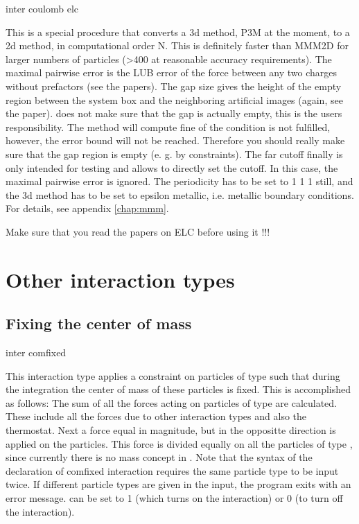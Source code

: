 \begin{essyntax}
  inter coulomb elc  
\end{essyntax}
This is a special procedure that converts a 3d method, \ie P3M at the
moment, to a 2d method, in computational order N. This is definitely
faster than MMM2D for larger numbers of particles (>400 at reasonable
accuracy requirements). The maximal pairwise error is the LUB error of
the force between any two charges without prefactors (see the papers).
The gap size gives the height of the empty region between the system
box and the neighboring artificial images (again, see the paper).
\es{} does not make sure that the gap is actually empty, this is the
users responsibility. The method will compute fine of the condition is
not fulfilled, however, the error bound will not be reached. Therefore
you should really make sure that the gap region is empty (e. g. by
constraints). The far cutoff finally is only intended for testing and
allows to directly set the cutoff. In this case, the maximal pairwise
error is ignored. The periodicity has to be set to 1 1 1 still, and
the 3d method has to be set to epsilon metallic, i.e.  metallic
boundary conditions. For details, see appendix \vref{chap:mmm}.

Make sure that you read the papers on ELC before using it !!!

\section{Other interaction types}
\label{sec:inter-other}

\subsection{Fixing the center of mass}
\begin{essyntax}
  inter   comfixed 
\end{essyntax}
This interaction type applies a constraint on particles of type
 such that during the integration the center of mass of
these particles is fixed. This is accomplished as follows: The sum of
all the forces acting on particles of type  are
calculated. These include all the forces due to other interaction
types and also the thermostat. Next a force equal in magnitude, but in
the oppositte direction is applied on the particles. This force is
divided equally on all the particles of type , since
currently there is no mass concept in \es. Note that the syntax of the
declaration of comfixed interaction requires the same particle type to
be input twice. If different particle types are given in the input,
the program exits with an error message.  can be set to 1
(which turns on the interaction) or 0 (to turn off the interaction).

